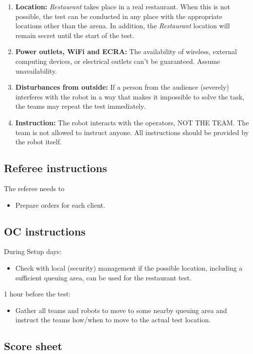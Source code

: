 \begin{enumerate}[nosep]
	\item \textbf{Location:} \emph{Restaurant} takes place in a real restaurant.
	When this is not possible, the test can be conducted in any place with the appropriate locations other than the arena.
	In addition, the \emph{Restaurant} location will remain secret until the start of the test.

	\item \textbf{Power outlets, WiFi and ECRA:} The availability of wireless, external computing devices, or electrical outlets can't be guaranteed. Assume unavailability.

	\item \textbf{Disturbances from outside:} If a person from the audience (severely) interferes with the robot in a way that makes it impossible to solve the task, the teams may repeat the test immediately.

	\item \textbf{Instruction:} The robot interacts with the operators, NOT THE TEAM.
	The team is not allowed to instruct anyone.
	All instructions should be provided by the robot itself.

\end{enumerate}

\subsection*{Referee instructions}

The referee needs to
\begin{itemize}
	\item Prepare orders for each client.
\end{itemize}

\subsection*{OC instructions}
During Setup days:
\begin{itemize}[nosep]
	\item Check with local (security) management if the possible location, including a sufficient queuing area, can be used for the restaurant test.
\end{itemize}

1 hour before the test:
\begin{itemize}[nosep]
	\item Gather all teams and robots to move to some nearby queuing area and instruct the teams how/when to move to the actual test location.
\end{itemize}

\newpage
\subsection*{Score sheet}


\cleardoublepage



